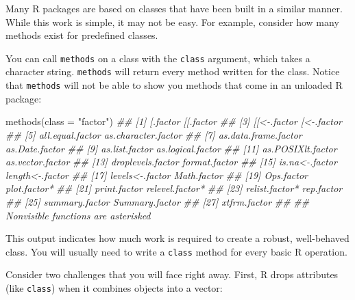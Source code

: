 \documentclass[
  letterpaper,
  DIV=11,
  numbers=noendperiod]{scrbook}
\newenvironment{Shaded}{\begin{snugshade}}{\end{snugshade}}
\newcommand{\AttributeTok}[1]{\textcolor[rgb]{0.40,0.45,0.13}{#1}}
\newcommand{\DocumentationTok}[1]{\textcolor[rgb]{0.37,0.37,0.37}{\textit{#1}}}
\newcommand{\FunctionTok}[1]{\textcolor[rgb]{0.28,0.35,0.67}{#1}}
\newcommand{\NormalTok}[1]{\textcolor[rgb]{0.00,0.23,0.31}{#1}}
\newcommand{\OtherTok}[1]{\textcolor[rgb]{0.00,0.23,0.31}{#1}}
\newcommand{\StringTok}[1]{\textcolor[rgb]{0.13,0.47,0.30}{#1}}
\begin{document}
Many R packages are based on classes that have been built in a similar
manner. While this work is simple, it may not be easy. For example,
consider how many methods exist for predefined classes.

You can call \texttt{methods} on a class with the \texttt{class}
argument, which takes a character string. \texttt{methods} will return
every method written for the class. Notice that \texttt{methods} will
not be able to show you methods that come in an unloaded R package:

\begin{Shaded}
\begin{Highlighting}[]
\FunctionTok{methods}\NormalTok{(}\AttributeTok{class =} \StringTok{"factor"}\NormalTok{)}
\DocumentationTok{\#\#  [1] [.factor             [[.factor           }
\DocumentationTok{\#\#  [3] [[\textless{}{-}.factor          [\textless{}{-}.factor          }
\DocumentationTok{\#\#  [5] all.equal.factor     as.character.factor }
\DocumentationTok{\#\#  [7] as.data.frame.factor as.Date.factor      }
\DocumentationTok{\#\#  [9] as.list.factor       as.logical.factor   }
\DocumentationTok{\#\# [11] as.POSIXlt.factor    as.vector.factor    }
\DocumentationTok{\#\# [13] droplevels.factor    format.factor       }
\DocumentationTok{\#\# [15] is.na\textless{}{-}.factor       length\textless{}{-}.factor     }
\DocumentationTok{\#\# [17] levels\textless{}{-}.factor      Math.factor         }
\DocumentationTok{\#\# [19] Ops.factor           plot.factor*        }
\DocumentationTok{\#\# [21] print.factor         relevel.factor*     }
\DocumentationTok{\#\# [23] relist.factor*       rep.factor          }
\DocumentationTok{\#\# [25] summary.factor       Summary.factor      }
\DocumentationTok{\#\# [27] xtfrm.factor        }
\DocumentationTok{\#\# }
\DocumentationTok{\#\#    Nonvisible functions are asterisked}
\end{Highlighting}
\end{Shaded}

This output indicates how much work is required to create a robust,
well-behaved class. You will usually need to write a \texttt{class}
method for every basic R operation.

Consider two challenges that you will face right away. First, R drops
attributes (like \texttt{class}) when it combines objects into a vector:

\begin{Shaded}
\end{Shaded}
\end{document}
